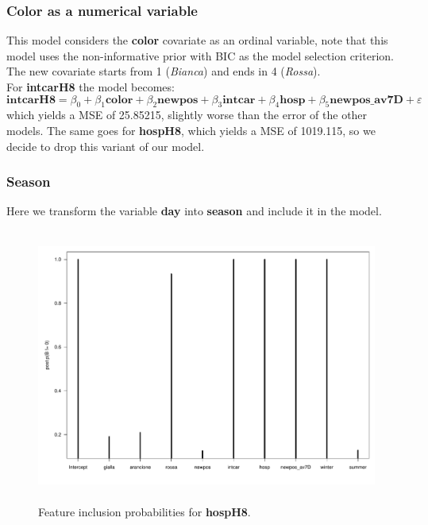 \documentclass[12pt,a4paper]{article}
\theoremstyle{definition}
\theoremstyle{remark}
\begin{document}
\begin{appendices}
    \subsubsection*{Color as a numerical variable}
    This model considers the \textbf{color} covariate as an ordinal variable, note that this model uses the non-informative prior with BIC as the model selection criterion. The new covariate starts from 1 (\textit{Bianca}) and ends in 4 (\textit{Rossa}).\\
    
    For \textbf{intcarH8} the model becomes:
\begin{dmath*}
	\textbf{intcarH8} = \beta_0 + \beta_1\textbf{color}  + \beta_2\textbf{newpos} + \beta_3\textbf{intcar} + \beta_4\textbf{hosp} + \beta_5\textbf{newpos\_av7D} + \varepsilon
\end{dmath*}
which yields a MSE of 25.85215, slightly worse than the error of the other models. The same goes for \textbf{hospH8}, which yields a MSE of 1019.115, so we decide to drop this variant of our model.

\subsubsection*{Season}

Here we transform the variable \textbf{day} into \textbf{season} and include it in the model.

\begin{figure}[htb!]
	\centering
	\includegraphics[width=140mm, height=90mm,scale=0.5]{szn1.pdf}
	\caption{Feature inclusion probabilities for \textbf{hospH8}.}
\end{figure}


\end{appendices}
\end{document}
